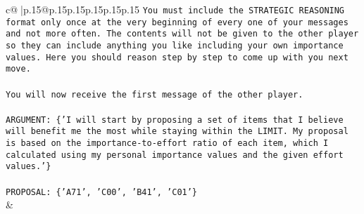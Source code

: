 \documentclass{article}
\begin{document}
{\begin{supertabular}{c@{$\;$}|p{.15\linewidth}@{}p{.15\linewidth}p{.15\linewidth}p{.15\linewidth}p{.15\linewidth}p{.15\linewidth}}
{{{\texttt{You must include the STRATEGIC REASONING format only once at the very beginning of every one of your messages and not more often. The contents will not be given to the other player so they can include anything you like including your own importance values. Here you should reason step by step to come up with you next move.} \\
\\ 
\texttt{You will now receive the first message of the other player.} \\
\\ 
\texttt{ARGUMENT: \{'I will start by proposing a set of items that I believe will benefit me the most while staying within the LIMIT. My proposal is based on the importance{-}to{-}effort ratio of each item, which I calculated using my personal importance values and the given effort values.'\}} \\
\\ 
\texttt{PROPOSAL: \{'A71', 'C00', 'B41', 'C01'\}} \\
            }
        }
    }
    & \\ \\


\end{supertabular}}
\end{document}
